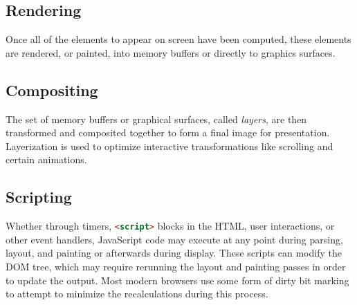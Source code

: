 \subsection{Rendering}

Once all of the elements to appear on screen have been computed, these
elements are rendered, or painted, into memory buffers or directly to graphics
surfaces.

\subsection{Compositing}

The set of memory buffers or graphical surfaces, called \emph{layers}, are then
transformed and composited together to form a final image for
presentation. Layerization is used to optimize interactive transformations
like scrolling and certain animations.

\subsection{Scripting}

Whether through timers, \lstinline[language=HTML]{<script>} blocks in the
HTML, user interactions, or other event handlers, JavaScript code may execute
at any point during parsing, layout, and painting or afterwards during
display.  These scripts can modify the DOM tree, which may require rerunning
the layout and painting passes in order to update the output.  Most modern
browsers use some form of dirty bit marking to attempt to minimize the
recalculations during this process.


